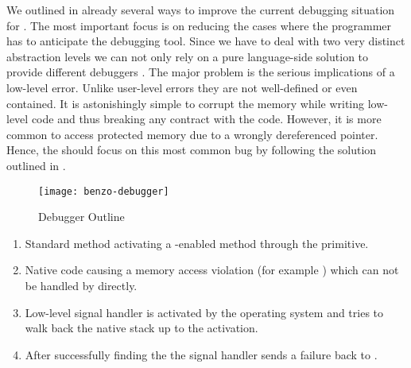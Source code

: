 We outlined in  already several ways to improve the current debugging situation for \B.
The most important focus is on reducing the cases where the programmer has to anticipate the debugging tool.
Since we have to deal with two very distinct abstraction levels we can not only rely on a pure language-side solution to provide different debuggers \cite{Chis13a}.
The major problem is the serious implications of a low-level error.
Unlike user-level errors they are not well-defined or even contained.
It is astonishingly simple to corrupt the \VM memory while writing low-level code and thus breaking any contract with the \VM code.
However, it is more common to access protected memory due to a wrongly dereferenced pointer.
Hence, the \B should focus on this most common bug by following the solution outlined in .
%
\begin{figure}[h]
	\centering
	\texttt{[image: benzo-debugger]}
	\caption{\B Debugger Outline}
\end{figure}
%
\begin{enumerate}
	\item Standard \PH method activating a \B-enabled method through the  primitive.
	\item Native code causing a memory access violation (for example ) which can not be handled by \PH directly.
	\item Low-level signal handler is activated by the operating system and tries to walk back the native stack up to the  activation.
	\item After successfully finding the  the signal handler sends a \B failure back to \PH.
\end{enumerate}


